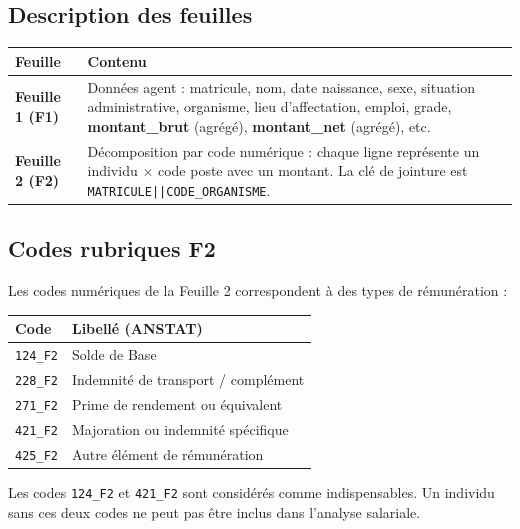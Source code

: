 \documentclass[12pt,a4paper,french]{article}
\newcommand{\code}[1]{\texttt{#1}}
\begin{document}
\subsection{Description des feuilles}

\begin{tabularx}{\textwidth}{lX}
    \toprule
    \textbf{Feuille} & \textbf{Contenu} \\
    \midrule
    \textbf{Feuille 1 (F1)} &
        Données agent : matricule, nom, date naissance, sexe,
        situation administrative, organisme, lieu d'affectation,
        emploi, grade, \textbf{montant\_brut} (agrégé),
        \textbf{montant\_net} (agrégé), etc. \\
    \textbf{Feuille 2 (F2)} &
        Décomposition par code numérique : chaque ligne représente un
        individu $\times$ code poste avec un montant.
        La clé de jointure est \texttt{MATRICULE||CODE\_ORGANISME}. \\
    \bottomrule
\end{tabularx}

\subsection{Codes rubriques F2}

Les codes numériques de la Feuille 2 correspondent à des types de rémunération :

\begin{tabularx}{\textwidth}{lX}
    \toprule
    \textbf{Code} & \textbf{Libellé (ANSTAT)} \\
    \midrule
    \code{124\_F2} & Solde de Base \\
    \code{228\_F2} & Indemnité de transport / complément \\
    \code{271\_F2} & Prime de rendement ou équivalent \\
    \code{421\_F2} & Majoration ou indemnité spécifique \\
    \code{425\_F2} & Autre élément de rémunération \\
    \bottomrule
\end{tabularx}

\begin{warningbox}
    Les codes \code{124\_F2} et \code{421\_F2} sont considérés comme
    indispensables. Un individu sans ces deux codes ne peut pas être inclus
    dans l'analyse salariale.
\end{warningbox}

\end{document}

